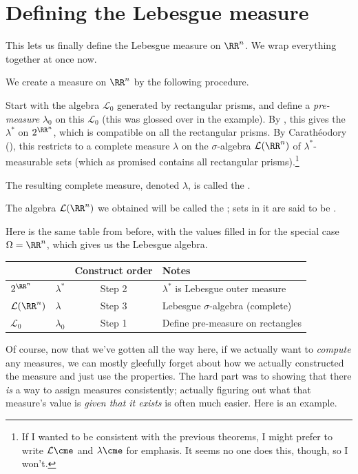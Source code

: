 \section{Defining the Lebesgue measure}
\label{sec:define_lebesgue_measure}
This lets us finally define the Lebesgue measure on $\RR^n$.
We wrap everything together at once now.
\begin{definition}
	We create a measure on $\RR^n$ by the following procedure.
	\begin{itemize}
		\ii Start with the algebra $\mathcal{L}_0$
		generated by rectangular prisms,
		and define a \emph{pre-measure} $\lambda_0$ on this $\mathcal{L}_0$
		(this was glossed over in the example).
		\ii By ,
		this gives the 
		$\lambda^\ast$ on $2^{\RR^n}$,
		which is compatible on all the rectangular prisms.
		\ii By Carath\'{e}odory (),
		this restricts to a complete measure $\lambda$
		on the $\sigma$-algebra $\mathcal{L}(\RR^n)$
		of $\lambda^\ast$-measurable sets
		(which as promised contains all rectangular prisms).\footnote{If
			I wanted to be consistent with the previous theorems,
			I might prefer to write $\mathcal{L}\cme$
			and $\lambda\cme$ for emphasis.
			It seems no one does this, though, so I won't.}
	\end{itemize}
	The resulting complete measure, denoted $\lambda$,
	is called the .

	The algebra $\mathcal{L}(\RR^n)$ we obtained will be called the
	;
	sets in it are said to be .
\end{definition}

Here is the same table from before,
with the values filled in for the special case $\Omega = \RR^n$,
which gives us the Lebesgue algebra.
\begin{center}
	\begin{tabular}[h]{llcl}
		& & Construct order & Notes \\ \hline
		$2^{\RR^n}$ & $\lambda^\ast$ & Step 2 &
			$\lambda^\ast$ is Lebesgue outer measure \\[1em]
		$\mathcal L(\RR^n)$ & $\lambda$ & Step 3 & Lebesgue $\sigma$-algebra (complete) \\[1em]
		$\mathcal L_0$ & $\lambda_0$ & Step 1 & Define pre-measure on rectangles
	\end{tabular}
\end{center}


Of course, now that we've gotten all the way here,
if we actually want to \emph{compute} any measures,
we can mostly gleefully forget about how we actually constructed
the measure and just use the properties.
The hard part was to showing that there \emph{is}
a way to assign measures consistently;
actually figuring out what that measure's value is
\emph{given that it exists} is often much easier.
Here is an example.

